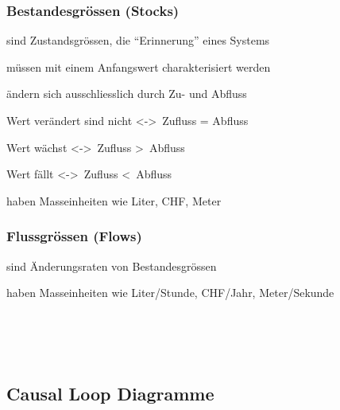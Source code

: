 \begin{multicols}{2}
	\subsubsection{Bestandesgrössen (Stocks)}
	\begin{compactitem}
		\item sind Zustandsgrössen, die “Erinnerung” eines Systems
		\item müssen mit einem Anfangswert charakterisiert werden
		\item ändern sich ausschliesslich durch Zu- und Abfluss
		\item Wert verändert sind nicht \textless-\textgreater\ Zufluss = Abfluss
		\item Wert wächst \textless-\textgreater\ Zufluss \textgreater\ Abfluss
		\item Wert fällt \textless-\textgreater\ Zufluss \textless\ Abfluss
		\item haben Masseinheiten wie Liter, CHF, Meter
	\end{compactitem}
	
	\subsubsection{Flussgrössen (Flows)}
	\begin{compactitem}
		\item sind Änderungsraten von Bestandesgrössen
		\item haben Masseinheiten wie Liter/Stunde, CHF/Jahr, Meter/Sekunde
	\end{compactitem} \ \\ \ \\ \ \\
\end{multicols}

\subsection{Causal Loop Diagramme}